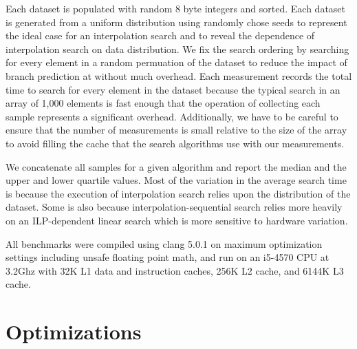 \documentclass[twocolumn]{article}
\begin{document}
Each dataset is populated with random 8 byte integers and sorted. Each dataset is generated from a uniform distribution using randomly chose seeds to represent the ideal case for an interpolation search and to reveal the dependence of interpolation search on data distribution. We fix the search ordering by searching for every element in a random permuation of the dataset to reduce the impact of branch prediction at without much overhead. Each measurement records the total time to search for every element in the dataset because the typical search in an array of 1,000 elements is fast enough that the operation of collecting each sample represents a significant overhead. Additionally, we have to be careful to ensure that the number of measurements is small relative to the size of the array to avoid filling the cache that the search algorithms use with our measurements.

We concatenate all samples for a given algorithm and report the median and the upper and lower quartile values. Most of the variation in the average search time is because the execution of interpolation search relies upon the distribution of the dataset. Some is also because interpolation-sequential search relies more heavily on an ILP-dependent linear search which is more sensitive to hardware variation.

All benchmarks were compiled using clang 5.0.1 on maximum optimization settings including unsafe floating point math, and run on an i5-4570 CPU at 3.2Ghz with 32K L1 data and instruction caches, 256K L2 cache, and 6144K L3 cache. 


\section{Optimizations}

\begin{figure}[t]
  \label{b-lr}
\end{figure} 
\end{document}

